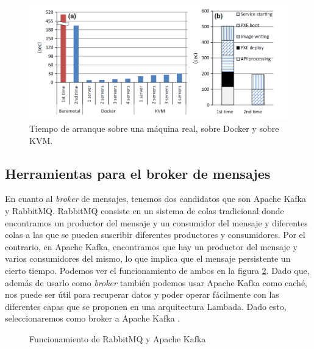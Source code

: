 \begin{figure}[htp]
\centering
\includegraphics[scale=0.40]{Imagenes/dockervsvm3.png}
\caption{Tiempo de arranque sobre una máquina real, sobre Docker y sobre
  KVM.}
\label{dock-3}
\end{figure}

\subsection{Herramientas para el broker de mensajes\label{hbrok}}

En cuanto al \emph{broker} de mensajes, tenemos dos candidatos que son 
Apache Kafka y RabbitMQ. RabbitMQ consiste en un sistema de colas
tradicional donde encontramos un productor del mensaje y un consumidor del
mensaje y diferentes colas a las que se pueden suscribir diferentes
productores y consumidores. Por el contrario, en Apache Kafka, encontramos
que hay un productor del mensaje y varios consumidores del mismo, lo que implica
que el mensaje persistente un cierto tiempo. Podemos ver el funcionamiento
de ambos en la figura \ref{brokers-img}. Dado que, además de usarlo
como \emph{broker} también podemos usar Apache Kafka como caché, nos puede ser
útil para recuperar datos y poder operar fácilmente con las diferentes capas
que se proponen en una arquitectura Lambada. Dado esto, seleccionaremos 
como broker a Apache Kafka \cite{Hrr-2}.

\begin{figure}[htp]
\centering
{}
\caption{Funcionamiento de RabbitMQ y Apache Kafka}
\label{brokers-img}
\end{figure}

